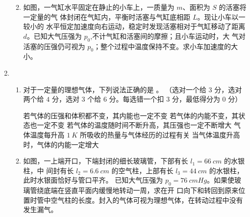 \begin{enumerate}
\begin{enumerate}

\item 
如图，一气缸水平固定在静止的小车上，一质量为 $ m $、面积为 $ S $ 的活塞将一定量的气
体封闭在气缸内，平衡时活塞与气缸底相距 $ L $。现让小车以一较小的
水平恒定加速度向右运动，稳定时发现活塞相对于气缸移动了距离
$ d $。已知大气压强为 $ p_{0} $,不计气缸和活塞间的摩擦；且小车运动时，大
气对活塞的压强仍可视为 $ p_{0} $；整个过程中温度保持不变。求小车加速度的大小。
\begin{figure}[h!]
	\flushright
	
\end{figure}





\end{enumerate}


\item 
{}
 \begin{enumerate}
 	\item
 对于一定量的理想气体，下列说法正确的是 \underlinegap 。
（选对一个给 $ 3 $ 分，选对两个给 $ 4 $
分，选对 $ 3 $ 个给 $ 6 $ 分。每选错一个扣 $ 3 $ 分，最低得分为 $ 0 $ 分）


\fivechoices
{若气体的压强和体积都不变，其内能也一定不变}
{若气体的内能不变，其状态也一定不变}
{若气体的温度随时间不断升高，其压强也一定不断增大}
{气体温度每升高 $ 1 \ K $ 所吸收的热量与气体经历的过程有关}
{当气体温度升高时，气体的内能一定增大}



\item 
如图，一上端开口，下端封闭的细长玻璃管，下部有长 $ l_{1} =66 \ cm $ 的水银柱，中
间封有长 $ l_{2} =6.6 \ cm $ 的空气柱，上部有长 $ l_{3} =44 \ cm $ 的水银柱，此时水银面恰好与管口平齐。
已知大气压强为 $ p_{0} =76 \ cm Hg $。如果使玻璃管绕底端在竖直平面内缓慢地转动一周，求在开
口向下和转回到原来位置时管中空气柱的长度。封入的气体可视为理想气体，在转动过程中没有
发生漏气。
\begin{figure}[h!]
	\flushright
	
\end{figure}





\end{enumerate}
\end{enumerate}
